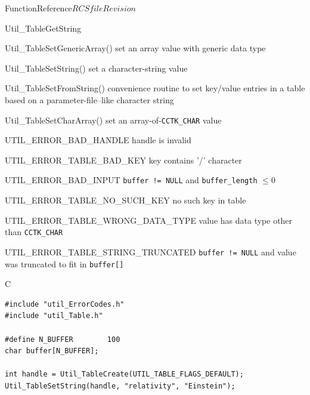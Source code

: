 \begin{cactuspart}{FunctionReference}{$RCSfile$}{$Revision$}
\begin{FunctionDescription}{Util\_TableGetString}
\begin{SeeAlsoSection}
\begin{SeeAlso}{Util\_TableSetGenericArray()}
set an array value with generic data type
\end{SeeAlso}
\begin{SeeAlso}{Util\_TableSetString()}
set a character-string value
\end{SeeAlso}
\begin{SeeAlso}{Util\_TableSetFromString()}
convenience routine to set key/value entries in a table based on a
parameter-file--like character string
\end{SeeAlso}
\begin{SeeAlso}{Util\_TableSetCharArray()}
set an array-of-\verb|CCTK_CHAR| value
\end{SeeAlso}
\end{SeeAlsoSection}

\begin{ErrorSection}
\begin{Error}{UTIL\_ERROR\_BAD\_HANDLE}
handle is invalid
\end{Error}
\begin{Error}{UTIL\_ERROR\_TABLE\_BAD\_KEY}
key contains '/' character
\end{Error}
\begin{Error}{UTIL\_ERROR\_BAD\_INPUT}
\verb|buffer != NULL| and \verb|buffer_length| $\le 0$
\end{Error}
\begin{Error}{UTIL\_ERROR\_TABLE\_NO\_SUCH\_KEY}
no such key in table
\end{Error}
\begin{Error}{UTIL\_ERROR\_TABLE\_WRONG\_DATA\_TYPE}
value has data type other than \verb|CCTK_CHAR|
\end{Error}
\begin{Error}{UTIL\_ERROR\_TABLE\_STRING\_TRUNCATED}
\quad
\verb|buffer != NULL| and value was truncated to fit in \verb|buffer[]|
\end{Error}
\end{ErrorSection}

\begin{ExampleSection}
\begin{Example}{C}
\begin{verbatim}
#include "util_ErrorCodes.h"
#include "util_Table.h"

#define N_BUFFER        100
char buffer[N_BUFFER];

int handle = Util_TableCreate(UTIL_TABLE_FLAGS_DEFAULT);
Util_TableSetString(handle, "relativity", "Einstein");


\end{verbatim}
\end{Example}
\end{ExampleSection}
\end{FunctionDescription}
\end{cactuspart}
